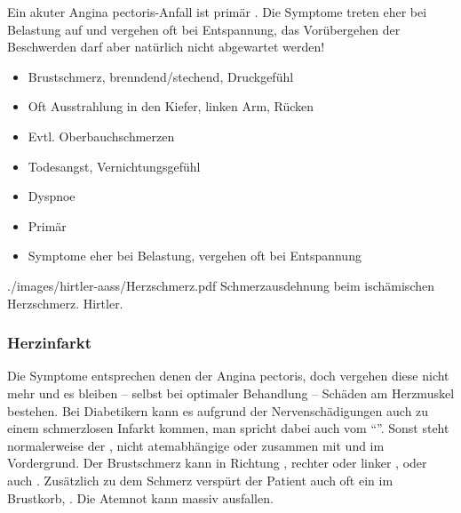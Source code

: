 {{Ein akuter Angina pectoris-Anfall ist primär . Die Symptome
treten eher bei Belastung auf und vergehen oft bei
Entspannung, das Vorübergehen der Beschwerden darf aber
natürlich nicht abgewartet werden!
}{
\begin{itemize}
  \item Brustschmerz, brenndend/stechend, Druckgefühl
  \item Oft Ausstrahlung in den Kiefer,
  linken Arm, Rücken
  \item Evtl. Oberbauchschmerzen
  \item Todesangst, Vernichtungsgefühl
  \item Dyspnoe
  \item Primär 
  \item Symptome eher bei Belastung, vergehen oft bei Entspannung
\end{itemize}

}
{./images/hirtler-aass/Herzschmerz.pdf}
{Schmerzausdehnung beim ischämischen
Herzschmerz.}
{Hirtler.}




\subsubsection{Herzinfarkt}
\label{topic:herzinfarkt}
\label{topic:myocardinfarkt}
\label{topic:mci}



{%
Die Symptome entsprechen denen der Angina
pectoris, doch vergehen diese nicht mehr und es bleiben --
selbst bei optimaler Behandlung -- Schäden am Herzmuskel
bestehen. Bei Diabetikern kann es aufgrund der
Nervenschädigungen auch zu einem schmerzlosen Infarkt
kommen, man spricht dabei auch vom \enquote{}.
Sonst steht normalerweise der , nicht
atemabhängige  oder
 zusammen mit  und
 im Vordergrund. Der Brustschmerz kann in
Richtung , rechter oder linker , 
oder auch  . Zusätzlich zu dem
Schmerz verspürt der Patient auch oft ein  im
Brustkorb, . Die Atemnot kann massiv ausfallen.

}}
